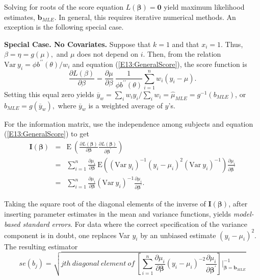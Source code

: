 Solving for roots of the score equation $L(\boldsymbol \beta) =
\mathbf{0}$ yield maximum likelihood estimates, $\mathbf{b}_{MLE}$.
In general, this requires iterative numerical methods. An exception
is the following special case.

\linejed

\textbf{Special Case. No Covariates.} Suppose that $k=1$ and that
$x_i =1$. Thus, $\beta = \eta = g(\mu),$ and $\mu$ does not depend
on $i$. Then, from the relation $\mathrm{Var~}y_i = \phi b^{\prime
\prime}(\theta)/w_i$  and equation (\ref{E13:GeneralScore}), the
score function is
\begin{equation*}
\frac{\partial  L( \beta) }{\partial \beta } = \frac{\partial
\mu}{\partial \beta} ~ \frac{1}{\phi b^{\prime \prime}(\theta)}
\sum_{i=1}^n w_i \left( y_i-\mu \right) .
\end{equation*}
Setting this equal zero yields $\overline{y}_w = \sum_i w_i y_i /
\sum_i w_i = \widehat{\mu}_{MLE} = g^{-1}(b_{MLE})$, or
$b_{MLE}=g(\overline{y}_w),$ where $\overline{y}_w $ is a weighted
average of $y$'s.

\linejed{}

For the information matrix, use the independence among subjects and
equation (\ref{E13:GeneralScore}) to get
\begin{eqnarray}\label{E13:GLMHessian}
\mathbf{I}(\boldsymbol \beta)
 &=& \mathrm{E~} \left( \frac{\partial
L(\boldsymbol \beta) }{\partial \boldsymbol \beta } \frac{\partial
L(\boldsymbol \beta) }{\partial \boldsymbol \beta ^{\prime}} \right) \nonumber \\
&=& \sum_{i=1}^n \frac{\partial \mu _i}{\partial \boldsymbol
\beta}~\mathrm{E} \left( \left( \mathrm{Var~}y_i\right) ^{-1}\left(
y_i-\mu _i\right)^2 \left( \mathrm{Var~}y_i\right) ^{-1}\right)
\frac{\partial \mu _i}{\partial
\boldsymbol \beta ^{\prime}} \nonumber \\
&=& \sum_{i=1}^n \frac{\partial \mu _i}{\partial \boldsymbol \beta}
\left( \mathrm{Var~}y_i\right) ^{-1} \frac{\partial \mu _i}{\partial
\boldsymbol \beta ^{\prime}} .
\end{eqnarray}

Taking the square root of the diagonal elements of the inverse of $\mathbf{I}(\boldsymbol \beta)$,
after inserting parameter estimates in the mean and variance functions, yields
\emph{model-based standard errors}. For data where the correct specification of the variance component
is in doubt, one replaces Var $y_i$ by an unbiased estimate $(y_i - \mu_i)^2$. The resulting estimator
\begin{equation*}
se(b_j) = \sqrt{ jth~diagonal~element~of~
[\sum_{i=1}^n \frac{\partial \mu _i}{\partial \boldsymbol \beta}
 (y_i - \mu_i)^{-2} \frac{\partial \mu _i}{\partial
\boldsymbol \beta ^{\prime}}
]|_{\boldsymbol \beta = \mathbf{b}_{MLE}}^{-1}}
\end{equation*}

